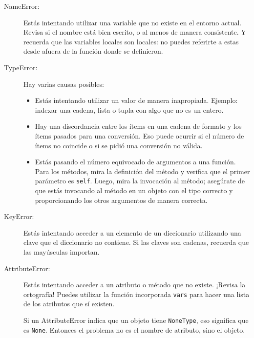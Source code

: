 \documentclass[10pt]{book}
\begin{document}
\begin{description}

\item[NameError:]  Estás intentando utilizar una variable que no
existe en el entorno actual.  Revisa si el nombre
está bien escrito, o al menos de manera consistente.
Y recuerda que las variables locales son locales: 
no puedes referirte a estas desde afuera de la función donde se definieron.

\item[TypeError:] Hay varias causas posibles:

\begin{itemize}

\item  Estás intentando utilizar un valor de manera inapropiada.  Ejemplo: indexar
una cadena, lista o tupla con algo que no es un entero.

\item Hay una discordancia entre los ítems en una cadena de formato y
los ítems pasados para una conversión.  Eso puede ocurrir si el número
de ítems no coincide o si se pidió una conversión no válida.

\item Estás pasando el número equivocado de argumentos a una función.
Para los métodos, mira la definición del método y
verifica que el primer parámetro es {\tt self}.  Luego, mira la
invocación al método; asegúrate de que estás invocando al método en un
objeto con el tipo correcto y proporcionando los otros argumentos
de manera correcta.

\end{itemize}

\item[KeyError:]  Estás intentando acceder a un elemento de un diccionario
utilizando una clave que el diccionario no contiene.  Si las claves
son cadenas, recuerda que las mayúsculas importan.

\item[AttributeError:] Estás intentando acceder a un atributo o método
  que no existe.  ¡Revisa la ortografía!  Puedes utilizar la función
  incorporada {\tt vars} para hacer una lista de los atributos que sí existen.

Si un AttributeError indica que un objeto tiene {\tt NoneType},
eso significa que es {\tt None}.  Entonces el problema no es el
nombre de atributo, sino el objeto.


\end{description}
\end{document}
